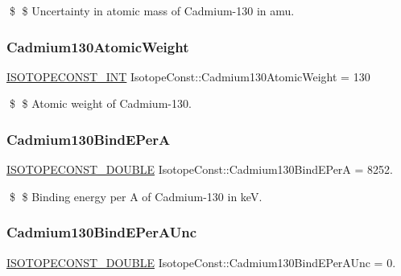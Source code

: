 \$ \$ Uncertainty in atomic mass of Cadmium-\/130 in amu. \mbox{\label{group___isotope_const-_cadmium-_cd130_ga6cf69b042d5b1b2da75dd718f164ce2d}} 
\subsubsection{\texorpdfstring{Cadmium130\+Atomic\+Weight}{Cadmium130AtomicWeight}}
{\footnotesize\ttfamily \mbox{\hyperlink{group___isotope_const-_macros_ga5f18360b3e99483a35c32d789e62621c}{I\+S\+O\+T\+O\+P\+E\+C\+O\+N\+S\+T\+\_\+\+I\+NT}} Isotope\+Const\+::\+Cadmium130\+Atomic\+Weight = 130}

\$ \$ Atomic weight of Cadmium-\/130. \mbox{\label{group___isotope_const-_cadmium-_cd130_ga10ec9b45829fd8bdb4214468d1c1c55d}} 
\subsubsection{\texorpdfstring{Cadmium130\+Bind\+E\+PerA}{Cadmium130BindEPerA}}
{\footnotesize\ttfamily \mbox{\hyperlink{group___isotope_const-_macros_ga8f45a7272ce02c0b4c65c44636ed719a}{I\+S\+O\+T\+O\+P\+E\+C\+O\+N\+S\+T\+\_\+\+D\+O\+U\+B\+LE}} Isotope\+Const\+::\+Cadmium130\+Bind\+E\+PerA = 8252.}

\$ \$ Binding energy per A of Cadmium-\/130 in keV. \mbox{\label{group___isotope_const-_cadmium-_cd130_gadbf0b350e38f6aea2bee8baa4244a268}} 
\subsubsection{\texorpdfstring{Cadmium130\+Bind\+E\+Per\+A\+Unc}{Cadmium130BindEPerAUnc}}
{\footnotesize\ttfamily \mbox{\hyperlink{group___isotope_const-_macros_ga8f45a7272ce02c0b4c65c44636ed719a}{I\+S\+O\+T\+O\+P\+E\+C\+O\+N\+S\+T\+\_\+\+D\+O\+U\+B\+LE}} Isotope\+Const\+::\+Cadmium130\+Bind\+E\+Per\+A\+Unc = 0.}


